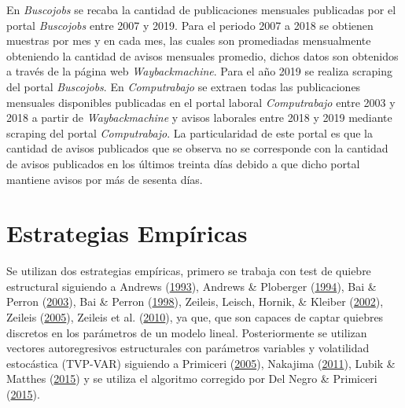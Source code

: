 \documentclass[12pt,oneside]{reedthesis}
\begin{document}
En \emph{Buscojobs} se recaba la cantidad de publicaciones mensuales publicadas por el portal \emph{Buscojobs} entre 2007 y 2019. Para el periodo 2007 a 2018 se obtienen muestras por mes y en cada mes, las cuales son promediadas mensualmente obteniendo la cantidad de avisos mensuales promedio, dichos datos son obtenidos a través de la página web \emph{Waybackmachine}. Para el año 2019 se realiza scraping del portal \emph{Buscojobs}. En \emph{Computrabajo} se extraen todas las publicaciones mensuales disponibles publicadas en el portal laboral \emph{Computrabajo} entre 2003 y 2018 a partir de \emph{Waybackmachine} y avisos laborales entre 2018 y 2019 mediante scraping del portal \emph{Computrabajo}. La particularidad de este portal es que la cantidad de avisos publicados que se observa no se corresponde con la cantidad de avisos publicados en los últimos treinta días debido a que dicho portal mantiene avisos por más de sesenta días.

\hypertarget{cap:Metodologia}{%
\chapter{Estrategias Empíricas}\label{cap:Metodologia}}

Se utilizan dos estrategias empíricas, primero se trabaja con test de quiebre estructural siguiendo a Andrews (\protect\hyperlink{ref-Andrews1993}{1993}), Andrews \& Ploberger (\protect\hyperlink{ref-Andrews1994}{1994}), Bai \& Perron (\protect\hyperlink{ref-BaiPerron2003}{2003}), Bai \& Perron (\protect\hyperlink{ref-BaiPerron1998}{1998}), Zeileis, Leisch, Hornik, \& Kleiber (\protect\hyperlink{ref-Zeileis2002}{2002}), Zeileis (\protect\hyperlink{ref-Zeileis2005}{2005}), Zeileis et al. (\protect\hyperlink{ref-Zeileis2010}{2010}), ya que, que son capaces de captar quiebres discretos en los parámetros de un modelo lineal. Posteriormente se utilizan vectores autoregresivos estructurales con parámetros variables y volatilidad estocástica (TVP-VAR) siguiendo a Primiceri (\protect\hyperlink{ref-Primiceri2005}{2005}), Nakajima (\protect\hyperlink{ref-Nakajima2011}{2011}), Lubik \& Matthes (\protect\hyperlink{ref-Lubik2016b}{2015}) y se utiliza el algoritmo corregido por Del Negro \& Primiceri (\protect\hyperlink{ref-DelNegro2015}{2015}).
\end{document}

